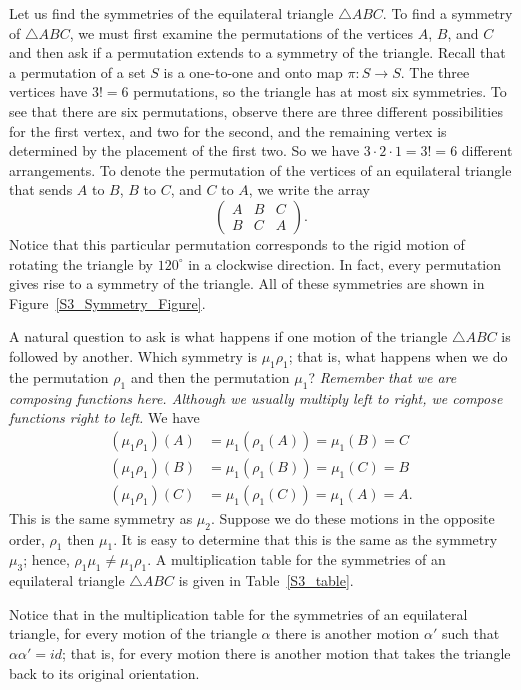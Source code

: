 Let us find the symmetries of the equilateral triangle $\bigtriangleup ABC$.  To find a symmetry of $\bigtriangleup ABC$, we must first examine the permutations of the vertices $A$, $B$, and $C$ and then ask if a permutation extends to a symmetry of the triangle.  Recall that a {\bfi permutation\/} of a set $S$ is a one-to-one and onto map $\pi :S \rightarrow S$.  The three vertices have $3! = 6$ permutations, so the triangle has at most six symmetries.  To see that there are six permutations, observe there are three different possibilities for the first vertex, and two for the second, and the remaining vertex is determined by the placement of the first two.  So we have $3 \cdot 2 \cdot 1 = 3! = 6$ different arrangements.  To denote the permutation of the vertices of an equilateral triangle that sends $A$ to $B$, $B$ to $C$, and $C$ to $A$, we write the array
\[
\begin{pmatrix}
A & B & C \\
B & C & A
\end{pmatrix}.
\]
Notice that this particular permutation corresponds to the rigid motion of rotating the triangle by $120^{\circ}$ in a clockwise direction.  In fact, every permutation gives rise to a symmetry of the triangle.  All of these symmetries are shown in Figure~\ref{S3_Symmetry_Figure}.

 
A natural question to ask is what happens if one motion of the triangle $\bigtriangleup ABC$ is followed by another.  Which symmetry is $\mu_1 \rho_1$; that is, what happens when we do the permutation $\rho_1$ and then the permutation $\mu_1$?  {\em Remember that we are composing functions here.  Although we usually multiply left to right, we compose functions right to left.} We have
\begin{align*}
(\mu_1 \rho_1)(A)  & = \mu_1( \rho_1( A ) ) = \mu_1( B ) = C \\
(\mu_1 \rho_1)(B) & = \mu_1( \rho_1( B ) ) = \mu_1( C ) = B \\
(\mu_1 \rho_1)(C) & = \mu_1( \rho_1( C ) ) = \mu_1( A ) = A.
\end{align*}
This is the same symmetry as $\mu_2$.  Suppose we do these motions in the opposite order, $\rho_1$ then $\mu_1$.  It is easy to determine that this is the same as the symmetry $\mu_3$; hence, $\rho_1 \mu_1 \neq \mu_1 \rho_1$.  A multiplication table for the symmetries of an equilateral triangle $\bigtriangleup ABC$ is given in Table~\ref{S3_table}.

Notice that in the multiplication table for the symmetries of an equilateral triangle, for every motion of the triangle $\alpha$ there is another motion $\alpha'$ such that $\alpha \alpha' = id$;  that is, for every motion there is another  motion that takes the triangle back to its original orientation.  

